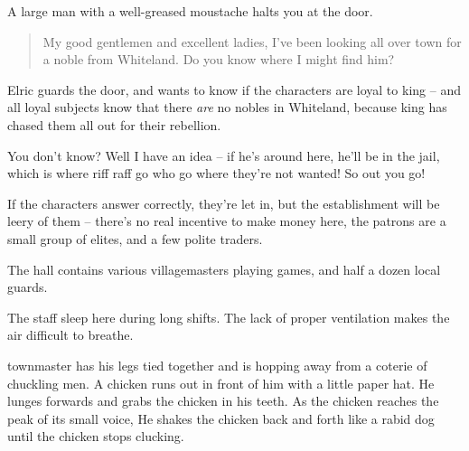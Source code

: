 
\setcounter{list}{0}

\begin{multicols}{2}


\begin{boxtext}

	A large man with a well-greased moustache halts you at the door.

	\begin{quotation}

		My good gentlemen and excellent ladies, I've been looking all over town for a noble from Whiteland.  Do you know where I might find him?

	\end{quotation}

\end{boxtext}

Elric guards the door, and wants to know if the characters are loyal to \gls{king} -- and all loyal subjects know that there \emph{are} no nobles in Whiteland, because \gls{king} has chased them all out for their rebellion.

\begin{speechtext}

	You don't know?  Well I have an idea -- if he's around here, he'll be in the jail, which is where riff raff go who go where they're not wanted!
	So out you go!

\end{speechtext}

If the characters answer correctly, they're let in, but the establishment will be leery of them -- there's no real incentive to make money here, the patrons are a small group of elites, and a few polite traders.

The hall contains various villagemasters playing games, and half a dozen local guards.


The staff sleep here during long shifts.  The lack of proper ventilation makes the air difficult to breathe.


\begin{boxtext}

	\Gls{townmaster} has his legs tied together and is hopping away from a coterie of chuckling men.
	 A chicken runs out in front of him with a little paper hat.
	 He lunges forwards and grabs the chicken in his teeth.
	 As the chicken reaches the peak of its small voice, He shakes the chicken back and forth like a rabid dog until the chicken stops clucking.


\end{boxtext}
\end{multicols}
